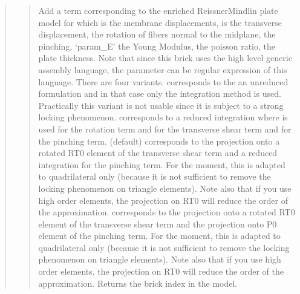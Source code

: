 \documentclass[a4paper,11pt,english]{sphinxmanual}
\begin{document}
\begin{quote}
\sphinxAtStartPar
{}
\begin{quote}

\sphinxAtStartPar
Add a term corresponding to the enriched Reissner\sphinxhyphen{}Mindlin plate
model for which  is the membrane displacements,
 is the transverse displacement,
 the rotation of
fibers normal to the midplane,
 the pinching,
‘param\_E’ the Young Modulus,
 the poisson ratio,
 the plate thickness. Note that since this brick
uses the high level generic assembly language, the parameter can
be regular expression of this language.
There are four variants.
 corresponds to the an
unreduced formulation and in that case only the integration
method  is used. Practically this variant is not usable since
it is subject to a strong locking phenomenon.
 corresponds to a reduced integration where  is
used for the rotation term and  for the transverse
shear term and  for the pinching term.
 (default) corresponds to the projection onto
a rotated RT0 element of the transverse shear term and a reduced integration for the pinching term.
For the moment, this is adapted to quadrilateral only (because it is not sufficient to
remove the locking phenomenon on triangle elements). Note also that if
you use high order elements, the projection on RT0 will reduce the order
of the approximation.
 corresponds to the projection onto
a rotated RT0 element of the transverse shear term and the projection onto P0 element of the pinching term.
For the moment, this is adapted to quadrilateral only (because it is not sufficient to
remove the locking phenomenon on triangle elements). Note also that if
you use high order elements, the projection on RT0 will reduce the order
of the approximation.
Returns the brick index in the model.
\end{quote}


\end{quote}
\end{document}
